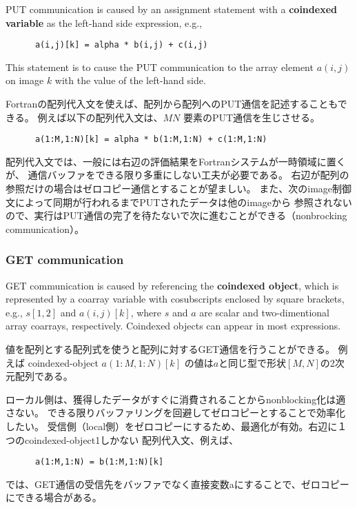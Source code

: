 PUT communication is caused by an assignment statement with a {\bf coindexed variable} 
as the left-hand side expression, e.g.,
\begin{verbatim}
      a(i,j)[k] = alpha * b(i,j) + c(i,j)
\end{verbatim}
This statement is to cause the PUT communication to the array element $a(i,j)$ on image $k$
with the value of the left-hand side.

Fortranの配列代入文を使えば、配列から配列へのPUT通信を記述することもできる。
例えば以下の配列代入文は、$M N$ 要素のPUT通信を生じさせる。
\begin{verbatim}
      a(1:M,1:N)[k] = alpha * b(1:M,1:N) + c(1:M,1:N)
\end{verbatim}

\requirement
配列代入文では、一般には右辺の評価結果をFortranシステムが一時領域に置くが、
通信バッファをできる限り多重にしない工夫が必要である。
右辺が配列の参照だけの場合はゼロコピー通信とすることが望ましい。
また、次のimage制御文によって同期が行われるまでPUTされたデータは他のimageから
参照されないので、実行はPUT通信の完了を待たないで次に進むことができる（nonbrocking communication）。


\subsubsection{GET communication}\label{sec:GET}

GET communication is caused by referencing the {\bf coindexed object}, 
which is represented by a coarray variable with cosubscripts enclosed by square brackets, 
e.g., $s[1,2]$ and $a(i,j)[k]$, where $s$ and $a$ are scalar and two-dimentional array coarrays,
respectively.
Coindexed objects can appear in most expressions.

値を配列とする配列式を使うと配列に対するGET通信を行うことができる。
例えば coindexed-object $a(1:M,1:N)[k]$ の値は$a$と同じ型で形状$[M, N]$の2次元配列である。


\requirement
ローカル側は、獲得したデータがすぐに消費されることからnonblocking化は適さない。
できる限りバッファリングを回避してゼロコピーとすることで効率化したい。
受信側（local側）をゼロコピーにするため、最適化が有効。右辺に１つのcoindexed-object1しかない
配列代入文、例えば、
\begin{verbatim}
      a(1:M,1:N) = b(1:M,1:N)[k]
\end{verbatim}
では、GET通信の受信先をバッファでなく直接変数aにすることで、ゼロコピーにできる場合がある。


